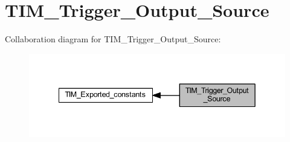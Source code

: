 \hypertarget{group___t_i_m___trigger___output___source}{}\section{T\+I\+M\+\_\+\+Trigger\+\_\+\+Output\+\_\+\+Source}
\label{group___t_i_m___trigger___output___source}
Collaboration diagram for T\+I\+M\+\_\+\+Trigger\+\_\+\+Output\+\_\+\+Source\+:\nopagebreak
\begin{figure}[H]
\begin{center}
\leavevmode
\includegraphics[width=342pt]{group___t_i_m___trigger___output___source}
\end{center}
\end{figure}

